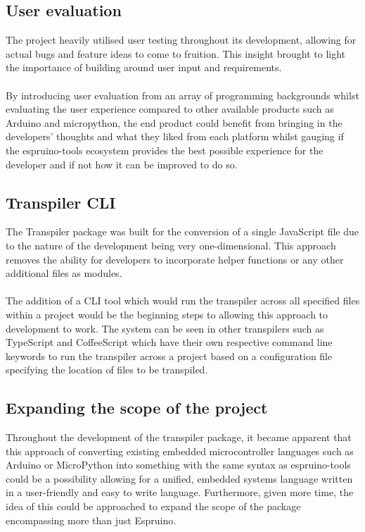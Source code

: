 \documentclass{l4proj}
\begin{document}
\subsection{User evaluation}

The project heavily utilised user testing throughout its development, allowing for actual bugs and feature ideas to come to fruition. This insight brought to light the importance of building around user input and requirements.
\\ \\
By introducing user evaluation from an array of programming backgrounds whilst evaluating the user experience compared to other available products such as Arduino and micropython, the end product could benefit from bringing in the developers' thoughts and what they liked from each platform whilst gauging if the espruino-tools ecosystem provides the best possible experience for the developer and if not how it can be improved to do so.

\subsection{Transpiler CLI}

The Transpiler package was built for the conversion of a single JavaScript file due to the nature of the development being very one-dimensional. This approach removes the ability for developers to incorporate helper functions or any other additional files as modules.
\\ \\
The addition of a CLI tool which would run the transpiler across all specified files within a project would be the beginning steps to allowing this approach to development to work. The system can be seen in other transpilers such as TypeScript and CoffeeScript which have their own respective command line keywords to run the transpiler across a project based on a configuration file specifying the location of files to be transpiled.



\subsection{Expanding the scope of the project}

Throughout the development of the transpiler package, it became apparent that this approach of converting existing embedded microcontroller languages such as Arduino or MicroPython into something with the same syntax as espruino-tools could be a possibility allowing for a unified, embedded systems language written in a user-friendly and easy to write language. Furthermore, given more time, the idea of this could be approached to expand the scope of the package encompassing more than just Espruino.
\end{document}
